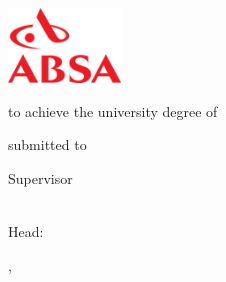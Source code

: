 

\begin{titlepage}

{\sffamily

\begin{center}

\includegraphics[width=30mm]{figures/ABSA1}

\vfill\vfill\vfill
\vfill\vfill\vfill

\myauthorwithexistingtitles

\vfill\vfill\vfill

{\LARGE\bfseries\mytitle}


\vfill\vfill\vfill
\vfill\vfill\vfill


{\bfseries\large\myworktitle}

to achieve the university degree of

\mygrade

\mydegreeprogramme


\vfill\vfill\vfill


submitted to

\vfill

{\bfseries\large\myuniversity}


\vfill\vfill\vfill


Supervisor

\mysupervisor

\vfill

\myinstitute\\
Head: \myinstitutehead\\

\vfill



\vfill\vfill\vfill


\mysubmissiontown, \mysubmissionmonth~\mysubmissionyear

\end{center}
}%
\end{titlepage}

\newpage

